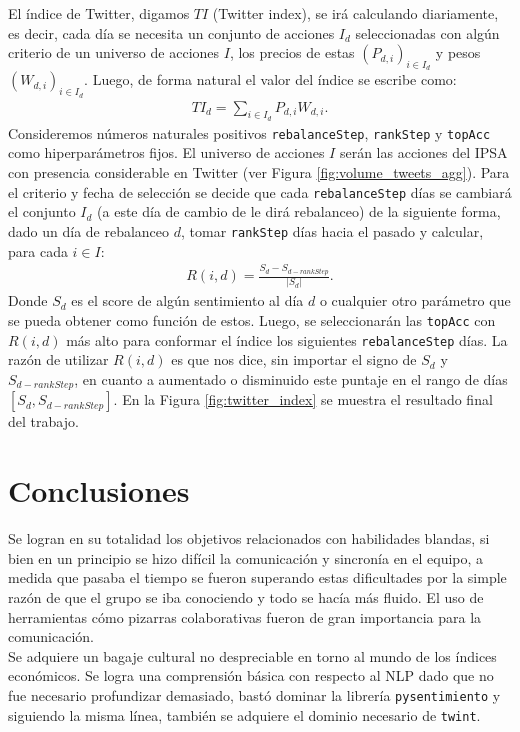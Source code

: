 \documentclass{article}
\begin{document}
El índice de Twitter, digamos $TI$ (Twitter index), se irá calculando diariamente, es decir, cada día se necesita un conjunto de acciones $I_d$ seleccionadas con algún criterio de un universo de acciones $I$, los precios de estas $(P_{d,i})_{i\in I_d}$ y pesos $(W_{d,i})_{i\in I_d}$. Luego, de forma natural el valor del índice se escribe como:
\begin{align}
	TI_d = \sum_{i\in I_d} P_{d,i} W_{d,i}.
\end{align}
Consideremos números naturales positivos \texttt{rebalanceStep}, \texttt{rankStep} y \texttt{topAcc} como hiperparámetros fijos. El universo de acciones $I$ serán las acciones del IPSA con presencia considerable en Twitter (ver Figura \ref{fig:volume_tweets_agg}). Para el criterio y fecha de selección se decide que cada \texttt{rebalanceStep} días se cambiará el conjunto $I_d$ (a este día de cambio de le dirá rebalanceo) de la siguiente forma, dado un día de rebalanceo $d$, tomar \texttt{rankStep} días hacia el pasado y calcular, para cada $i\in I$: 
\begin{align*}\label{eq:rank}
	R(i, d) = \frac{S_d - S_{d-rankStep}}{|S_d|}.
\end{align*}
Donde $S_d$ es el score de algún sentimiento al día $d$ o cualquier otro parámetro que se pueda obtener como función de estos. Luego, se seleccionarán las \texttt{topAcc} con $R(i,d)$ más alto para conformar el índice los siguientes \texttt{rebalanceStep} días. La razón de utilizar $R(i,d)$ es que nos dice, sin importar el signo de $S_d$ y $S_{d-rankStep}$, en cuanto a aumentado o disminuido este puntaje en el rango de días $[S_d, S_{d-rankStep}]$. En la Figura \ref{fig:twitter_index} se muestra el resultado final del trabajo.

\newpage
\section{Conclusiones}
Se logran en su totalidad los objetivos relacionados con habilidades blandas, si bien en un principio se hizo difícil la comunicación y sincronía en el equipo, a medida que pasaba el tiempo se fueron superando estas dificultades por la simple razón de que el grupo se iba conociendo y todo se hacía más fluido. El uso de herramientas cómo pizarras colaborativas fueron de gran importancia para la comunicación.\\

Se adquiere un bagaje cultural no despreciable en torno al mundo de los índices económicos. Se logra una comprensión básica con respecto al NLP dado que no fue necesario profundizar demasiado, bastó dominar la librería \texttt{pysentimiento} y siguiendo la misma línea, también se adquiere el dominio necesario de \texttt{twint}.\\
\end{document}
